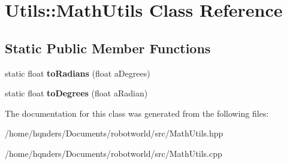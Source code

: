 \hypertarget{class_utils_1_1_math_utils}{}\section{Utils\+:\+:Math\+Utils Class Reference}
\label{class_utils_1_1_math_utils}
\subsection*{Static Public Member Functions}
\begin{DoxyCompactItemize}
\item 
static float {\bfseries to\+Radians} (float a\+Degrees)\hypertarget{class_utils_1_1_math_utils_a1c1f12a1367c1bb5370e03228f0f7e76}{}\label{class_utils_1_1_math_utils_a1c1f12a1367c1bb5370e03228f0f7e76}

\item 
static float {\bfseries to\+Degrees} (float a\+Radian)\hypertarget{class_utils_1_1_math_utils_a375dca50afb40203156c8e1e30354659}{}\label{class_utils_1_1_math_utils_a375dca50afb40203156c8e1e30354659}

\end{DoxyCompactItemize}


The documentation for this class was generated from the following files\+:\begin{DoxyCompactItemize}
\item 
/home/hqnders/\+Documents/robotworld/src/Math\+Utils.\+hpp\item 
/home/hqnders/\+Documents/robotworld/src/Math\+Utils.\+cpp\end{DoxyCompactItemize}
